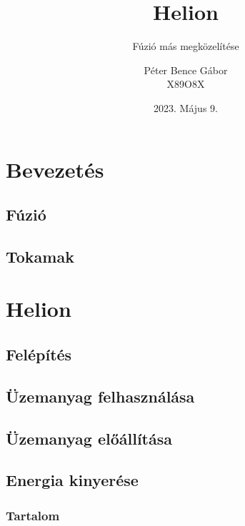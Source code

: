 \documentclass{beamer}
\title{Helion}
\subtitle{Fúzió más megközelítése}
\author{Péter Bence Gábor\\X89O8X}
\institute{Széchenyi István Egyetem}
\date{2023. Május 9.}
\begin{document}
\titlepage

\section{Bevezetés}
\subsection{Fúzió}
\subsection{Tokamak}

\section{Helion}
\subsection{Felépítés}
\subsection{Üzemanyag felhasználása}
\subsection{Üzemanyag előállítása}
\subsection{Energia kinyerése}

\begin{frame}
    \frametitle{Tartalom}
    \tableofcontents
\end{frame}
\end{document}
